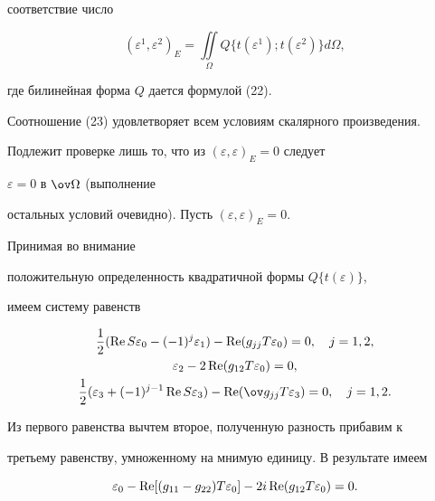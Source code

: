 соответствие число 


\begin{equation} 


(\varepsilon^1,\varepsilon^2)_E= 


\iint\limits_\Omega Q\{t(\varepsilon^1);t(\varepsilon^2)\}d\Omega, 


\end{equation} 


где билинейная форма $Q$ дается формулой (22). 


 


Соотношение (23) удовлетворяет всем условиям скалярного произведения. 


Подлежит проверке лишь то, что из $(\varepsilon,\varepsilon)_E=0$ следует 


$\varepsilon=0$ в $\ov\Omega$ (выполнение 


остальных условий очевидно). Пусть $(\varepsilon,\varepsilon)_E=0$. 


Принимая во внимание 


положительную определенность квадратичной формы $Q\{t(\varepsilon)\}$, 


имеем систему равенств 


\begin{gather} 


\frac{1}{2}(\re S\varepsilon_0-(-1)^j\varepsilon_1)- 


\re(g_{jj}T\varepsilon_0)=0,\quad j=1,2,\notag \\ 


% 


\varepsilon_2-2\re(g_{12}T\varepsilon_0)=0, \\ 


\frac{1}{2}(\varepsilon_3+(-1)^{j-1}\re S\varepsilon_3)- 


\re(\ov g_{jj}T\varepsilon_3)=0,\quad j=1,2.\notag 


\end{gather} 


Из первого равенства вычтем второе, полученную разность прибавим к 


третьему равенству, умноженному на мнимую единицу. В результате имеем 


\begin{equation} 


\varepsilon_0-\re[(g_{11}-g_{22})T\varepsilon_0]- 


2i\re(g_{12}T\varepsilon_0)=0. 


\end{equation} 


